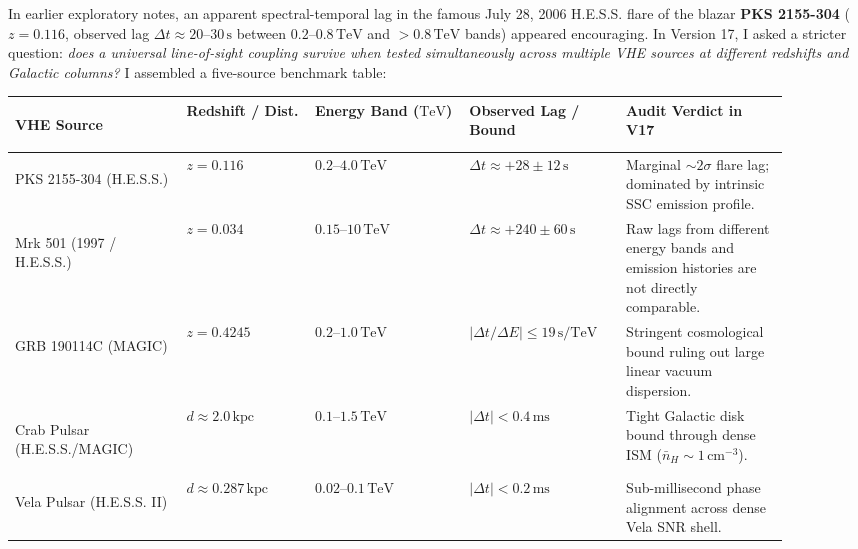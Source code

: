 \documentclass[10pt,a4paper]{article}
\begin{document}
\par
In earlier exploratory notes, an apparent spectral-temporal lag in the famous July 28, 2006 H.E.S.S. flare of the blazar \textbf{PKS 2155-304} ($z = 0.116$, observed lag $\Delta t \approx 20\text{--}30\,\text{s}$ between $0.2\text{--}0.8\,\text{TeV}$ and $>0.8\,\text{TeV}$ bands) appeared encouraging. In Version 17, I asked a stricter question: \emph{does a universal line-of-sight coupling survive when tested simultaneously across multiple VHE sources at different redshifts and Galactic columns?} I assembled a five-source benchmark table:

\begin{center}\vspace{-2pt}
{\footnotesize
\begin{tabular}{@{}>{\bfseries\raggedright\arraybackslash}p{0.20\linewidth}>{\raggedright\arraybackslash}p{0.15\linewidth}>{\raggedright\arraybackslash}p{0.18\linewidth}>{\raggedright\arraybackslash}p{0.18\linewidth}>{\raggedright\arraybackslash}p{0.19\linewidth}@{}}
\toprule
VHE Source & Redshift / Dist. & Energy Band ($\text{TeV}$) & Observed Lag / Bound & Audit Verdict in V17 \\
\midrule
PKS 2155-304 (H.E.S.S.) & $z = 0.116$ & $0.2\text{--}4.0\,\text{TeV}$ & $\Delta t \approx +28 \pm 12\,\text{s}$ & Marginal $\sim 2\sigma$ flare lag; dominated by intrinsic SSC emission profile. \\
Mrk 501 (1997 / H.E.S.S.) & $z = 0.034$ & $0.15\text{--}10\,\text{TeV}$ & $\Delta t \approx +240 \pm 60\,\text{s}$ & Raw lags from different energy bands and emission histories are not directly comparable. \\
GRB 190114C (MAGIC) & $z = 0.4245$ & $0.2\text{--}1.0\,\text{TeV}$ & $|\Delta t / \Delta E| \le 19\,\text{s/TeV}$ & Stringent cosmological bound ruling out large linear vacuum dispersion. \\
Crab Pulsar (H.E.S.S./MAGIC) & $d \approx 2.0\,\text{kpc}$ & $0.1\text{--}1.5\,\text{TeV}$ & $|\Delta t| < 0.4\,\text{ms}$ & Tight Galactic disk bound through dense ISM ($\bar{n}_H \sim 1\,\text{cm}^{-3}$). \\
Vela Pulsar (H.E.S.S. II) & $d \approx 0.287\,\text{kpc}$ & $0.02\text{--}0.1\,\text{TeV}$ & $|\Delta t| < 0.2\,\text{ms}$ & Sub-millisecond phase alignment across dense Vela SNR shell. \\
\bottomrule
\end{tabular}}
\end{center}
\end{document}
